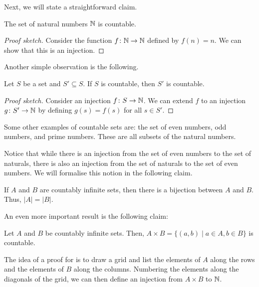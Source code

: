 \documentclass[11pt,usenames, dvipsnames]{article}
\begin{document}
Next, we will state a straightforward claim.

\begin{claim}
  The set of natural numbers $\mathbb{N}$ is countable.
\end{claim}

\begin{proof}[Proof sketch]
  Consider the function $f \colon \mathbb{N} \to \mathbb{N}$ defined by $f(n) = n$. We can show that this is an injection.
\end{proof}

Another simple observation is the following.

\begin{claim}
  Let $S$ be a set and $S' \subseteq S$. If $S$ is countable, then $S'$ is countable.
\end{claim}

\begin{proof}[Proof sketch]
  Consider an injection $f \colon S \to \mathbb{N}$. We can extend $f$ to an injection $g \colon S' \to \mathbb{N}$ by defining $g(s) = f(s)$ for all $s \in S'$.
\end{proof}

\begin{example}
  Some other examples of countable sets are: the set of even numbers, odd numbers, and prime numbers. These are all subsets of the natural numbers.
\end{example}

Notice that while there is an injection from the set of even numbers to the set of naturals, there is also an injection from the set of naturals to the set of even numbers. We will formalise this notion in the following claim.

\begin{claim}
  If $A$ and $B$ are countably infinite sets, then there is a bijection between $A$ and $B$. Thus, $|A| = |B|$.
\end{claim}

An even more important result is the following claim:

\begin{claim}
  Let $A$ and $B$ be countably infinite sets. Then, $A \times B = \{(a, b) \mid a \in A, b \in B\}$ is countable.
\end{claim}

The idea of a proof for  is to draw a grid and list the elements of $A$ along the rows and the elements of $B$ along the columns. Numbering the elements along the diagonals of the grid, we can then define an injection from $A \times B$ to $\mathbb{N}$.
\end{document}
